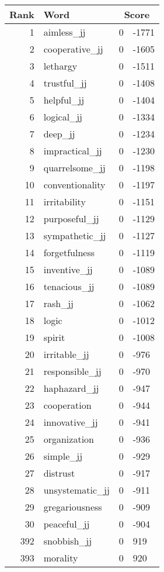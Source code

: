 \begin{longtable}[!htbp]{| rlr@{.}l |}
    \hline
    \textbf{Rank} & \textbf{Word} & \multicolumn{2}{c|}{\textbf{Score}} \\
    \hline
    \endhead
    1 & aimless\_jj & 0 & -1771 \\
    2 & cooperative\_jj & 0 & -1605 \\
    3 & lethargy & 0 & -1511 \\
    4 & trustful\_jj & 0 & -1408 \\
    5 & helpful\_jj & 0 & -1404 \\
    6 & logical\_jj & 0 & -1334 \\
    7 & deep\_jj & 0 & -1234 \\
    8 & impractical\_jj & 0 & -1230 \\
    9 & quarrelsome\_jj & 0 & -1198 \\
    10 & conventionality & 0 & -1197 \\
    11 & irritability & 0 & -1151 \\
    12 & purposeful\_jj & 0 & -1129 \\
    13 & sympathetic\_jj & 0 & -1127 \\
    14 & forgetfulness & 0 & -1119 \\
    15 & inventive\_jj & 0 & -1089 \\
    16 & tenacious\_jj & 0 & -1089 \\
    17 & rash\_jj & 0 & -1062 \\
    18 & logic & 0 & -1012 \\
    19 & spirit & 0 & -1008 \\
    20 & irritable\_jj & 0 & -976 \\
    21 & responsible\_jj & 0 & -970 \\
    22 & haphazard\_jj & 0 & -947 \\
    23 & cooperation & 0 & -944 \\
    24 & innovative\_jj & 0 & -941 \\
    25 & organization & 0 & -936 \\
    26 & simple\_jj & 0 & -929 \\
    27 & distrust & 0 & -917 \\
    28 & unsystematic\_jj & 0 & -911 \\
    29 & gregariousness & 0 & -909 \\
    30 & peaceful\_jj & 0 & -904 \\
    392 & snobbish\_jj & 0 & 919 \\
    393 & morality & 0 & 920 \\

\end{longtable}
